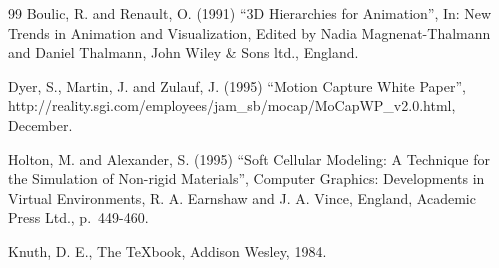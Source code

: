 \documentclass{SBCbookchapter}
\begin{document}
\begin{thebibliography}{99}
 Boulic, R. and Renault, O. (1991) ``3D Hierarchies for
  Animation'', In: New Trends in Animation and Visualization, Edited
  by Nadia Magnenat-Thalmann and Daniel Thalmann, John Wiley \& Sons
  ltd., England.

 Dyer, S., Martin, J. and Zulauf, J. (1995) ``Motion
  Capture White Paper'',
  http://reality.sgi.com/employees/jam\_sb/mocap/MoCapWP\_v2.0.html,
  December.

 Holton, M. and Alexander, S. (1995) ``Soft Cellular
  Modeling: A Technique for the Simulation of Non-rigid Materials'',
  Computer Graphics: Developments in Virtual Environments, R. A.
  Earnshaw and J. A. Vince, England, Academic Press Ltd., p.~449-460.

 Knuth, D. E., The TeXbook, Addison Wesley, 1984.
\end{thebibliography}
\end{document}
